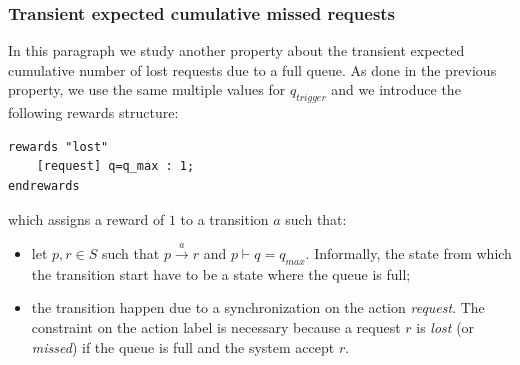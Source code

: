 \subsubsection{Transient expected cumulative missed requests }
In this paragraph we study another property about the transient
expected cumulative number of lost requests due to a full queue. As
done in the previous property, we use the same multiple values for
$q_{trigger}$ and we introduce the following rewards structure:
\begin{verbatim}
rewards "lost"
	[request] q=q_max : 1;
endrewards
\end{verbatim}
which assigns a reward of $1$ to a transition $a$ such that:
\begin{itemize}
\item let $p, r \in S$ such that $ p \xrightarrow{a} r$ and $p \vdash
  q= q_{max}$. Informally, the state from which the transition start
  have to be a state where the queue is full;
\item the transition happen due to a synchronization on the action
  \emph{request}. The constraint on the action label is necessary
  because a request $r$ is \emph{lost} (or \emph{missed}) if the queue
  is full and the system accept $r$.
\end{itemize}


